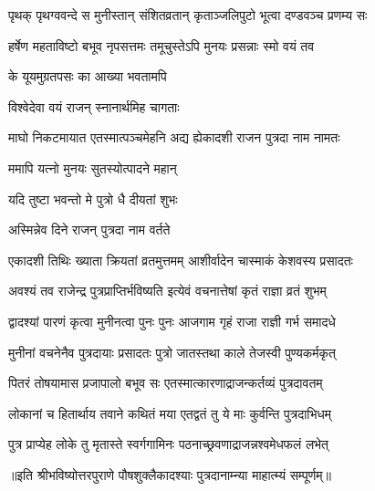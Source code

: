 \twolineshloka
{पृथक् पृथग्ववन्दे स मुनीस्तान् संशितव्रतान्}
{कृताञ्जलिपुटो भूत्वा दण्डवञ्च प्रणम्य सः} %

\twolineshloka
{हर्षेण महताविष्टो बभूव नृपसत्तमः}
{तमूचुस्तेऽपि मुनयः प्रसन्नाः स्मो वयं तव} %



\onelineshloka
{के यूयमुग्रतपसः का आख्या भवतामपि} %



\onelineshloka
{विश्वेदेवा वयं राजन् स्नानार्थमिह चागताः} %

\twolineshloka
{माघो निकटमायात एतस्मात्पञ्चमेहनि}
{अद्य ह्येकादशी राजन पुत्रदा नाम नामतः} %



\onelineshloka
{ममापि यत्नो मुनयः सुतस्योत्पादने महान्} %

\onelineshloka
{यदि तुष्टा भवन्तो मे पुत्रो धै दीयतां शुभः}


\onelineshloka
{अस्मिन्नेव दिने राजन् पुत्रदा नाम वर्तते} %

\twolineshloka
{एकादशी तिथिः ख्याता क्रियतां व्रतमुत्तमम्}
{आशीर्वादेन चास्माकं केशवस्य प्रसादतः} %

\twolineshloka
{अवश्यं तव राजेन्द्र पुत्रप्राप्तिर्भविष्यति}
{इत्येवं वचनात्तेषां कृतं राज्ञा व्रतं शुभम्} %


\twolineshloka
{द्वादश्यां पारणं कृत्वा मुनीनत्वा पुनः पुनः}
{आजगाम गृहं राजा राज्ञी गर्भ समादधे} %

\twolineshloka
{मुनीनां वचनेनैव पुत्रदायाः प्रसादतः}
{पुत्रो जातस्तथा काले तेजस्वी पुण्यकर्मकृत्} %

\twolineshloka
{पितरं तोषयामास प्रजापालो बभूव सः}
{एतस्मात्कारणाद्राजन्कर्तव्यं पुत्रदावतम्} %

\twolineshloka
{लोकानां च हितार्थाय तवाने कथितं मया}
{एतद्वतं तु ये माः कुर्वन्ति पुत्रदाभिधम्} %

\twolineshloka
{पुत्र प्राप्येह लोके तु मृतास्ते स्वर्गगामिनः}
{पठनाच्छ्रवणाद्राजन्नश्वमेधफलं लभेत्} %

॥इति श्रीभविष्योत्तरपुराणे पौषशुक्लैकादश्याः पुत्रदानाम्न्या माहात्म्यं सम्पूर्णम्॥


